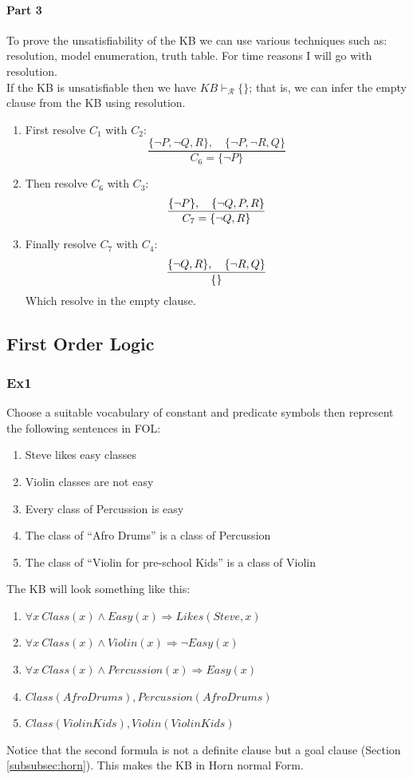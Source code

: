 \documentclass[10pt,a4paper]{article}
\newcommand{\braces}[1]{%
  \lbrace{#1}\rbrace}
\begin{document}
\paragraph{Part 3}
To prove the unsatisfiability of the KB we can use various techniques such as: resolution, model enumeration, truth table. For time reasons I will go with resolution.\\
If the KB is unsatisfiable then we have $KB \vdash_{\mathcal{R}} \{\}$; that is, we can infer the empty clause from the KB using resolution.

\begin{enumerate}
\item First resolve $C_1$ with $C_2$:
\[\frac{\lbrace \neg P, \neg Q, R \rbrace,\quad \braces{\neg P, \neg R, Q} }{C_6=\braces{\neg P}}\]
\item Then resolve $C_6$ with $C_3$:
\[\frac{\braces{\neg P},\quad \braces{\neg Q,P,R}}{C_7=\braces{\neg Q, R}}\]
\item Finally resolve $C_7$ with $C_4$:
\[\frac{\braces{\neg Q,R},\quad \braces{\neg R, Q}}{\braces{}}\]
Which resolve in the empty clause.
\end{enumerate}




\subsection{First Order Logic}

\subsubsection{Ex1}
Choose a suitable vocabulary of constant and predicate symbols then represent the following sentences in FOL:
\begin{enumerate}
\item Steve likes easy classes
\item Violin classes are not easy
\item Every class of Percussion is easy
\item The class of “Afro Drums” is a class of Percussion
\item The class of “Violin for pre-school Kids” is a class of Violin
\end{enumerate}
The KB will look something like this:
\begin{enumerate}

\item $\forall x\ Class(x)\wedge Easy(x) \Rightarrow Likes(Steve,x)$
\item $\forall x\ Class(x)\wedge Violin(x) \Rightarrow \neg Easy(x)$
\item $\forall x\ Class(x)\wedge Percussion(x) \Rightarrow Easy(x)$
\item $Class(AfroDrums), Percussion(AfroDrums)$
\item $Class(ViolinKids), Violin(ViolinKids)$

\end{enumerate}
Notice that the second formula is not a definite clause but a goal clause (Section \ref{subsubsec:horn}). This makes the KB in Horn normal Form.
\end{document}
